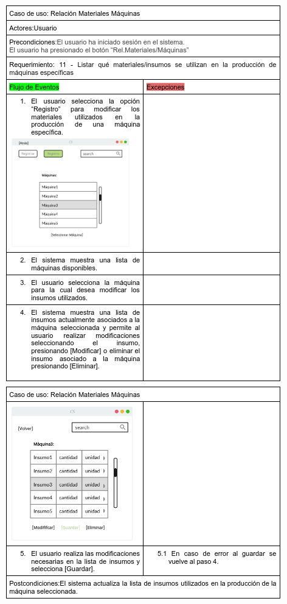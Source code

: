 \documentclass{article}
\begin{document}
    \begin{center}
        \includegraphics[width=1\linewidth]{imagenes/11_cons_mod_elim.png}
        \includegraphics[width=1\linewidth]{imagenes/11_cons_mod_elim2.png} 
    \end{center}
    
\end{document}
